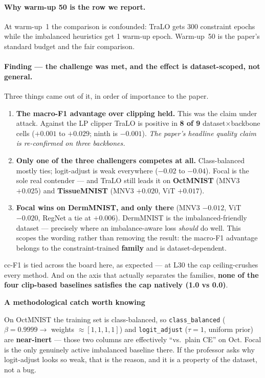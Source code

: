\documentclass[11pt,a4paper]{article}
\newenvironment{callout}[1]
  {\par\medskip\noindent\begin{lrbox}{\calloutbox}%
   \begin{minipage}{\dimexpr\linewidth-20pt\relax}%
   \textbf{#1}\par\smallskip}
  {\end{minipage}\end{lrbox}%
   \setlength{\fboxsep}{10pt}%
   \colorbox{boxgrey}{\usebox{\calloutbox}}\par\medskip}
\begin{document}
\paragraph{Why warm-up 50 is the row we report.} At warm-up~1 the comparison is confounded: TraLO
gets 300 constraint epochs while the imbalanced heuristics get 1 warm-up epoch. Warm-up~50 is the
paper's standard budget and the fair comparison.

\paragraph{Finding --- the challenge was met, and the effect is dataset-scoped, not general.}
Three things came out of it, in order of importance to the paper.

\begin{enumerate}
\item \textbf{The macro-F1 advantage over clipping held.} This was the claim under attack. Against
      the LP clipper TraLO is positive in \textbf{8 of 9} dataset$\times$backbone cells ($+0.001$ to
      $+0.029$; ninth is $-0.001$). \emph{The paper's headline quality claim is re-confirmed on
      three backbones.}
\item \textbf{Only one of the three challengers competes at all.} Class-balanced mostly ties;
      logit-adjust is weak everywhere ($-0.02$ to $-0.04$). Focal is the sole real contender ---
      and TraLO still leads it on \textbf{OctMNIST} (MNV3 $+0.025$) and \textbf{TissueMNIST}
      (MNV3 $+0.020$, ViT $+0.017$).
\item \textbf{Focal wins on DermMNIST, and only there} (MNV3 $-0.012$, ViT $-0.020$, RegNet a tie
      at $+0.006$). DermMNIST is the imbalanced-friendly dataset --- precisely where an
      imbalance-aware loss \emph{should} do well. This scopes the wording rather than removing the
      result: the macro-F1 advantage belongs to the constraint-trained \textbf{family} and is
      dataset-dependent.
\end{enumerate}

cc-F1 is tied across the board here, as expected --- at L30 the cap ceiling-crushes every method.
And on the axis that actually separates the families, \textbf{none of the four clip-based baselines
satisfies the cap natively (1.0 vs 0.0)}.

\begin{callout}{\textcolor{warnred}{A methodological catch worth knowing}}
On OctMNIST the training set is class-balanced, so \texttt{class\_balanced}
($\beta{=}0.9999 \rightarrow$ weights $\approx [1,1,1,1]$) and \texttt{logit\_adjust} ($\tau{=}1$,
uniform prior) are \textbf{near-inert} --- those two columns are effectively ``vs.\ plain CE'' on
Oct. Focal is the only genuinely active imbalanced baseline there. If the professor asks why
logit-adjust looks so weak, that is the reason, and it is a property of the dataset, not a bug.
\end{callout}
\end{document}
